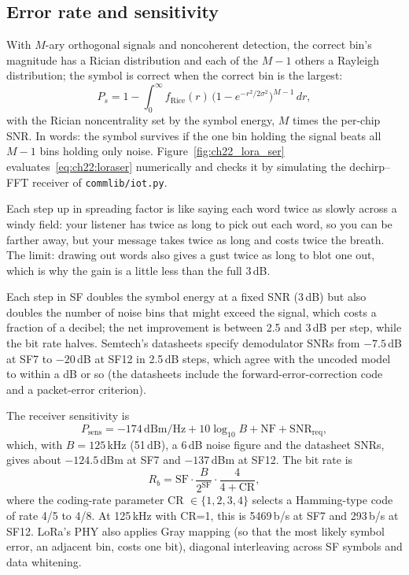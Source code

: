 \subsection{Error rate and sensitivity}

With $M$-ary orthogonal signals and noncoherent detection, the correct bin's magnitude has a Rician
distribution and each of the $M-1$ others a Rayleigh distribution; the symbol is correct when the
correct bin is the largest:
\begin{equation}
P_s=1-\int_0^\infty f_{\text{Rice}}(r)\,\big(1-e^{-r^2/2\sigma^2}\big)^{M-1}\,dr,
\label{eq:ch22:loraser}
\end{equation}
with the Rician noncentrality set by the symbol energy, $M$ times the per-chip SNR. In words: the
symbol survives if the one bin holding the signal beats all $M-1$ bins holding only noise.
Figure~\ref{fig:ch22_lora_ser} evaluates~\eqref{eq:ch22:loraser} numerically and checks it by
simulating the dechirp--FFT receiver of \texttt{commlib/iot.py}.

\begin{analogy}
Each step up in spreading factor is like saying each word twice as slowly across a windy field:
your listener has twice as long to pick out each word, so you can be farther away, but your message
takes twice as long and costs twice the breath. The limit: drawing out words also gives a gust
twice as long to blot one out, which is why the gain is a little less than the full 3\,dB.
\end{analogy}

Each step in SF doubles the symbol energy at a fixed SNR (3\,dB) but also doubles the number of noise
bins that might exceed the signal, which costs a fraction of a decibel; the net improvement is between
2.5 and 3\,dB per step, while the bit rate halves. Semtech's datasheets specify demodulator SNRs from
$-7.5$\,dB at SF7 to $-20$\,dB at SF12 in 2.5\,dB steps, which agree with the uncoded model to within
a dB or so (the datasheets include the forward-error-correction code and a packet-error criterion).

The receiver sensitivity is
\begin{equation}
P_{\text{sens}}=-174\,\text{dBm/Hz}+10\log_{10}B+\text{NF}+\text{SNR}_{\text{req}},
\label{eq:ch22:sens}
\end{equation}
which, with $B=125$\,kHz (51\,dB), a 6\,dB noise figure and the datasheet SNRs, gives about
$-124.5$\,dBm at SF7 and $-137$\,dBm at SF12. The bit rate is
\begin{equation}
R_b=\text{SF}\cdot\frac{B}{2^{\text{SF}}}\cdot\frac{4}{4+\text{CR}},
\label{eq:ch22:lorarate}
\end{equation}
where the coding-rate parameter CR $\in\{1,2,3,4\}$ selects a Hamming-type code of rate 4/5 to 4/8.
At 125\,kHz with CR=1, this is 5469\,b/s at SF7 and 293\,b/s at SF12. LoRa's PHY also applies Gray
mapping (so that the most likely symbol error, an adjacent bin, costs one bit), diagonal interleaving
across SF symbols and data whitening.


